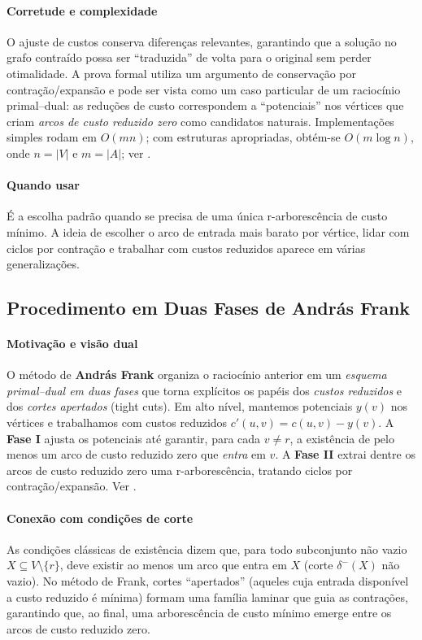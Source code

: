 \documentclass[12pt,a4paper]{article}
\begin{document}
\paragraph{Corretude e complexidade}
O ajuste de custos conserva diferenças relevantes, garantindo que a solução no grafo contraído possa ser “traduzida” de volta para o original sem perder otimalidade. A prova formal utiliza um argumento de conservação por contração/expansão e pode ser vista como um caso particular de um raciocínio primal–dual: as reduções de custo correspondem a “potenciais” nos vértices que criam \emph{arcos de custo reduzido zero} como candidatos naturais. Implementações simples rodam em \(O(mn)\); com estruturas apropriadas, obtém-se \(O(m\log n)\), onde \(n=|V|\) e \(m=|A|\); ver \cite{schrijver2003comb}.

\paragraph{Quando usar}
É a escolha padrão quando se precisa de uma única r-arborescência de custo mínimo. A ideia de escolher o arco de entrada mais barato por vértice, lidar com ciclos por contração e trabalhar com custos reduzidos aparece em várias generalizações.

\subsection{Procedimento em Duas Fases de András Frank}

\paragraph{Motivação e visão dual}
O método de \textbf{András Frank} organiza o raciocínio anterior em um \emph{esquema primal–dual em duas fases} que torna explícitos os papéis dos \emph{custos reduzidos} e dos \emph{cortes apertados} (tight cuts). Em alto nível, mantemos potenciais \(y(v)\) nos vértices e trabalhamos com custos reduzidos \(c'(u,v)=c(u,v)-y(v)\). A \textbf{Fase I} ajusta os potenciais até garantir, para cada \(v\neq r\), a existência de pelo menos um arco de custo reduzido zero que \emph{entra} em \(v\). A \textbf{Fase II} extrai dentre os arcos de custo reduzido zero uma r-arborescência, tratando ciclos por contração/expansão. Ver \cite{frank2014,schrijver2003comb}.

\paragraph{Conexão com condições de corte}
As condições clássicas de existência dizem que, para todo subconjunto não vazio \(X\subseteq V\setminus\{r\}\), deve existir ao menos um arco que entra em \(X\) (corte \(\delta^-(X)\) não vazio). No método de Frank, cortes “apertados” (aqueles cuja entrada disponível a custo reduzido é mínima) formam uma família laminar que guia as contrações, garantindo que, ao final, uma arborescência de custo mínimo emerge entre os arcos de custo reduzido zero.
\end{document}
